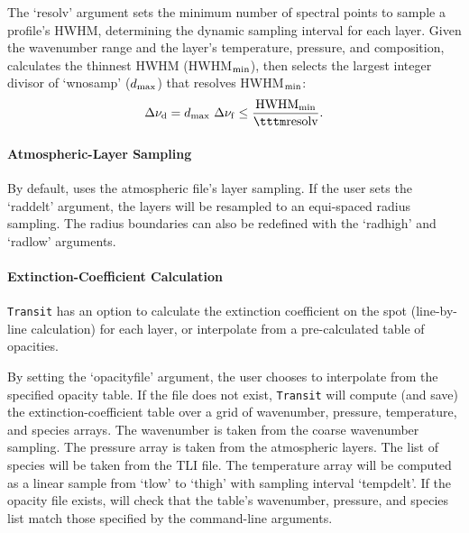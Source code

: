 \documentclass[letterpaper, 12pt]{article}
\begin{document}
The `{\tttb resolv}' argument  sets the minimum
number of spectral points to sample a profile's HWHM, determining the
dynamic sampling interval for each layer.
Given the wavenumber range and the layer's temperature, pressure, and
composition, {\transit} calculates the thinnest HWHM (HWHM$\sb{\rm
  min}$), then {\transit} selects the largest integer divisor of
{\tttm `wnosamp'} ($d\sb{\rm max}$) that resolves HWHM$\sb{\rm min}$:
\begin{equation}
  \Delta\nu\sb{\rm d} =    d\sb{\rm max}\ \Delta\nu\sb{\rm f} 
                      \leq \frac{\rm HWHM\sb{min}}{\tttm \rm{resolv}}.
\end{equation}



\paragraph{Atmospheric-Layer  Sampling}

By default, {\transit} uses the atmospheric file's layer sampling.  If
the user sets the `{\tttb raddelt}' argument, the layers will be
resampled to an equi-spaced radius sampling.  The radius boundaries
can also be redefined with the `{\tttb radhigh}' and `{\tttb radlow}'
arguments.

\paragraph{Extinction-Coefficient Calculation}
\label{sec:opacity}

{\tt Transit} has an option to calculate the extinction coefficient on
the spot (line-by-line calculation) for each layer, or interpolate
from a pre-calculated table of opacities.

By setting the `{\tttb opacityfile}' argument, the user chooses to
interpolate from the specified opacity table.  If the file does not
exist, {\tt Transit} will compute (and save) the
extinction-coefficient table over a grid of wavenumber, pressure,
temperature, and species arrays.  The wavenumber is taken from the
coarse wavenumber sampling.  The pressure array is taken from the
atmospheric layers.  The list of species will be taken from the TLI
file.  The temperature array will be computed as a linear sample from
{\tttb `tlow'} to {\tttb `thigh'} with sampling interval {\tttb
  `tempdelt'}.  If the opacity file exists, {\transit} will check that
the table's wavenumber, pressure, and species list match those
specified by the command-line arguments.
\end{document}

